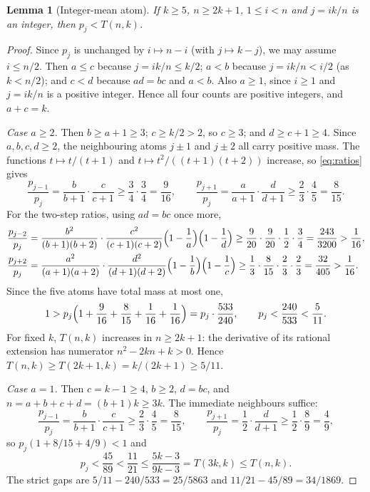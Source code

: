 \documentclass[11pt]{article}
\newtheorem{lemma}[theorem]{Lemma}
\theoremstyle{remark}
\begin{document}
\begin{lemma}[Integer-mean atom]\label{lem:meanatom}
If \(k\ge5\), \(n\ge2k+1\), \(1\le i<n\) and \(j=ik/n\) is an integer, then
\(p_j<T(n,k)\).
\end{lemma}
\begin{proof}
Since \(p_j\) is unchanged by \(i\mapsto n-i\) (with \(j\mapsto k-j\)), we may
assume \(i\le n/2\). Then \(a\le c\) because \(j=ik/n\le k/2\); \(a<b\)
because \(j=ik/n<i/2\) (as \(k<n/2\)); and \(c<d\) because \(ad=bc\) and
\(a<b\). Also
\(a\ge1\), since \(i\ge1\) and \(j=ik/n\) is a positive integer. Hence all four
counts are positive integers, and \(a+c=k\).

\emph{Case \(a\ge2\).} Then \(b\ge a+1\ge3\); \(c\ge k/2>2\), so \(c\ge3\);
and \(d\ge c+1\ge4\). Since \(a,b,c,d\ge2\), the neighbouring atoms
\(j\pm1\) and \(j\pm2\) all carry positive mass. The functions
\(t\mapsto t/(t+1)\) and \(t\mapsto t^2/((t+1)(t+2))\) increase, so
\eqref{eq:ratios} gives
\[
 \frac{p_{j-1}}{p_j}=\frac{b}{b+1}\cdot\frac{c}{c+1}\ge\frac34\cdot\frac34=\frac9{16},
 \qquad
 \frac{p_{j+1}}{p_j}=\frac{a}{a+1}\cdot\frac{d}{d+1}\ge\frac23\cdot\frac45=\frac8{15}.
\]
For the two-step ratios, using \(ad=bc\) once more,
\begin{align*}
 \frac{p_{j-2}}{p_j}
 &=\frac{b^2}{(b+1)(b+2)}\cdot\frac{c^2}{(c+1)(c+2)}
   \Bigl(1-\frac1a\Bigr)\Bigl(1-\frac1d\Bigr)
 \ge\frac{9}{20}\cdot\frac9{20}\cdot\frac12\cdot\frac34=\frac{243}{3200}>\frac1{16},\\
 \frac{p_{j+2}}{p_j}
 &=\frac{a^2}{(a+1)(a+2)}\cdot\frac{d^2}{(d+1)(d+2)}
   \Bigl(1-\frac1b\Bigr)\Bigl(1-\frac1c\Bigr)
 \ge\frac13\cdot\frac{8}{15}\cdot\frac23\cdot\frac23=\frac{32}{405}>\frac1{16}.
\end{align*}
Since the five atoms have total mass at most one,
\[
 1>p_j\Bigl(1+\frac9{16}+\frac8{15}+\frac1{16}+\frac1{16}\Bigr)=p_j\cdot\frac{533}{240},
 \qquad p_j<\frac{240}{533}<\frac5{11}.
\]
For fixed \(k\), \(T(n,k)\) increases in \(n\ge2k+1\): the derivative of its
rational extension has numerator \(n^2-2kn+k>0\). Hence
\(T(n,k)\ge T(2k+1,k)=k/(2k+1)\ge5/11\).

\emph{Case \(a=1\).} Then \(c=k-1\ge4\), \(b\ge2\), \(d=bc\), and
\(n=a+b+c+d=(b+1)k\ge3k\). The immediate neighbours suffice:
\[
 \frac{p_{j-1}}{p_j}=\frac{b}{b+1}\cdot\frac{c}{c+1}\ge\frac23\cdot\frac45=\frac8{15},\qquad
 \frac{p_{j+1}}{p_j}=\frac12\cdot\frac{d}{d+1}\ge\frac12\cdot\frac89=\frac49,
\]
so \(p_j(1+8/15+4/9)<1\) and
\[
 p_j<\frac{45}{89}<\frac{11}{21}\le\frac{5k-3}{9k-3}=T(3k,k)\le T(n,k).
\]
The strict gaps are \(5/11-240/533=25/5863\) and \(11/21-45/89=34/1869\).
\end{proof}
\end{document}
